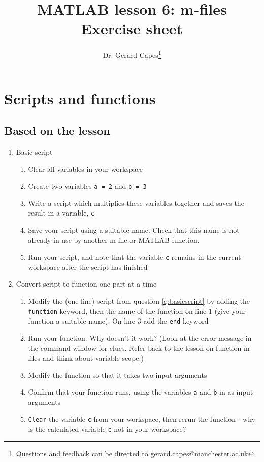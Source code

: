 \documentclass{article}
\title{MATLAB lesson 6: m-files\\Exercise sheet}
\date{}
\author{Dr. Gerard Capes\thanks{Questions and feedback can be directed to \href{mailto:gerard.capes@manchester.ac.uk?subject=Feedback on MATLAB m-files exercise sheet}{gerard.capes@manchester.ac.uk}}}
\begin{document}
	\maketitle
	
	\section{Scripts and functions}
	\subsection*{Based on the lesson}
	\begin{enumerate}
		\item Basic script
		\label{q:basicscript}
		\begin{enumerate}
			\item Clear all variables in your workspace
			\item Create two variables \texttt{a = 2} and \texttt{b = 3}
			\item Write a script which multiplies these variables together and saves the result in a variable, \texttt{c}
			\item Save your script using a suitable name. Check that this name is not already in use by another m-file or MATLAB function.	
			\item Run your script, and note that the variable \texttt{c} remains in the current workspace after the script has finished
		\end{enumerate}
		\item Convert script to function one part at a time
		\begin{enumerate}
			\item Modify the (one-line) script from question \ref{q:basicscript} by adding the \texttt{function} keyword, then the name of the function on line 1 (give your function a suitable name). On line 3 add the \texttt{end} keyword
			\item Run your function. Why doesn't it work? (Look at the error message in the command window for clues. Refer back to the lesson on function m-files and think about variable scope.)
			\item Modify the function so that it takes two input arguments
			\item Confirm that your function runs, using the variables \texttt{a} and \texttt{b} in as input arguments
			\item \texttt{Clear} the variable \texttt{c} from your workspace, then rerun the function - why is the calculated variable \texttt{c} not in your workspace?

\end{enumerate}
\end{enumerate}
\end{document}
